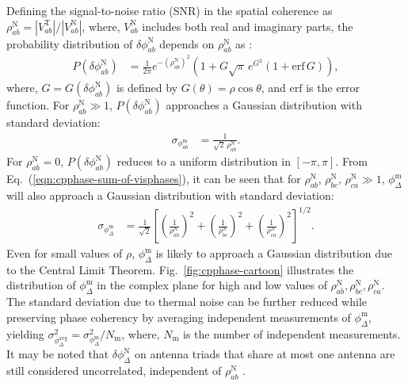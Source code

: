 \documentclass[
reprint,
superscriptaddress,
amsmath,
amssymb,
aps,
prd
]{revtex4-1}
\begin{document}
Defining the signal-to-noise ratio (SNR) in the spatial coherence as $\rho_{ab}^\textrm{N} = |V_{ab}^\textrm{T}|/|V_{ab}^\textrm{N}|$, where, $V_{ab}^\textrm{N}$ includes both real and imaginary parts, the probability distribution of $\delta\phi_{ab}^\textrm{N}$ depends on $\rho_{ab}^\textrm{N}$ as \cite{cra89}:
\begin{align}
  P(\delta\phi_{ab}^\textrm{N}) &= \frac{1}{2\pi} e^{-(\rho_{ab}^\textrm{N})^2} \left(1 + G\sqrt{\pi}\,e^{G^2}(1+\mathrm{erf}\,G)\right),
\end{align}
where, $G=G(\delta\phi_{ab}^\textrm{N})$ is defined by $G(\theta)=\rho\cos\theta$, and $\mathrm{erf}$ is the error function. For $\rho_{ab}^\textrm{N}\gg 1$, $P(\delta\phi_{ab}^\textrm{N})$ approaches a Gaussian distribution with standard deviation:
\begin{align}
  \sigma_{\phi_{ab}^\textrm{m}} &= \frac{1}{\sqrt{2}\,\rho_{ab}^\textrm{N}}.
\end{align}
For $\rho_{ab}^\textrm{N}=0$, $P(\delta\phi_{ab}^\textrm{N})$ reduces to a uniform distribution in $[-\pi,\pi]$. From Eq.~(\ref{eqn:cpphase-sum-of-visphases}), it can be seen that for $\rho_{ab}^\textrm{N},\,\rho_{bc}^\textrm{N},\,\rho_{ca}^\textrm{N}\gg 1$, $\phi_\Delta^\textrm{m}$ will also approach a Gaussian distribution with standard deviation:
\begin{align}
  \sigma_{\phi_\Delta^\textrm{m}} &= \frac{1}{\sqrt{2}}\left[\left(\frac{1}{\rho_{ab}^\textrm{N}}\right)^2 + \left(\frac{1}{\rho_{bc}^\textrm{N}}\right)^2 + \left(\frac{1}{\rho_{ca}^\textrm{N}}\right)^2\right]^{1/2}. \label{eqn:cprms-noise}
\end{align}
Even for small values of $\rho$, $\phi_\Delta^\textrm{m}$ is likely to approach a Gaussian distribution due to the Central Limit Theorem. Fig.~\ref{fig:cpphase-cartoon} illustrates the distribution of $\phi_\Delta^\textrm{m}$ in the complex plane for high and low values of $\rho_{ab}^\textrm{N},\rho_{bc}^\textrm{N},\rho_{ca}^\textrm{N}$. The standard deviation due to thermal noise can be further reduced while preserving phase coherency by averaging independent measurements of $\phi_\Delta^\textrm{m}$, yielding $\sigma_{\phi_\Delta^\textrm{avg}}^2 = \sigma_{\phi_\Delta^\textrm{m}}^2 / N_\textrm{m}$,
where, $N_\textrm{m}$ is the number of independent measurements. It may be noted that $\delta\phi_\Delta^\textrm{N}$ on antenna triads that share at most one antenna are still considered uncorrelated, independent of $\rho_{ab}^\textrm{N}$ \cite{kul89}.
\end{document}
